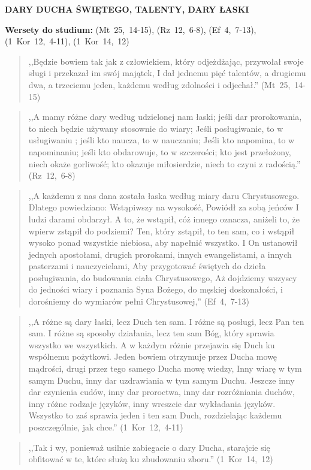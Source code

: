 \documentclass[10pt,a4paper,oneside]{article}
\begin{document}
\centerline{\textbf{\MakeUppercase{Dary Ducha Świętego, talenty, dary łaski}}}
\begin{center}
\textbf{Wersety do studium:} \mbox{(Mt 25, 14-15)}, \mbox{(Rz 12, 6-8)}, \mbox{(Ef 4, 7-13)}, \mbox{(1 Kor 12, 4-11)}, \mbox{(1 Kor 14, 12)}
\end{center}
\begin{quote}
,,Będzie bowiem tak jak z człowiekiem, który odjeżdżając, przywołał swoje sługi i przekazał im swój majątek, I dał jednemu pięć talentów, a drugiemu dwa, a trzeciemu jeden, każdemu według zdolności i odjechał.'' \mbox{(Mt 25, 14-15)}
\end{quote}
\begin{quote}
,,A mamy różne dary według udzielonej nam łaski; jeśli dar prorokowania, to niech będzie używany stosownie do wiary; Jeśli posługiwanie, to w usługiwaniu ; jeśli kto naucza, to w nauczaniu; Jeśli kto napomina, to w napominaniu; jeśli kto obdarowuje, to w szczerości; kto jest przełożony, niech okaże gorliwość; kto okazuje miłosierdzie, niech to czyni z radością.'' \mbox{(Rz 12, 6-8)}
\end{quote}
\begin{quote}
,,A każdemu z nas dana została łaska według miary daru Chrystusowego. Dlatego powiedziano: Wstąpiwszy na wysokość, Powiódł za sobą jeńców I ludzi darami obdarzył. A to, że wstąpił, cóż innego oznacza, aniżeli to, że wpierw zstąpił do podziemi? Ten, który zstąpił, to ten sam, co i wstąpił wysoko ponad wszystkie niebiosa, aby napełnić wszystko. I On ustanowił jednych apostołami, drugich prorokami, innych ewangelistami, a innych pasterzami i nauczycielami, Aby przygotować świętych do dzieła posługiwania, do budowania ciała Chrystusowego, Aż dojdziemy wszyscy do jedności wiary i poznania Syna Bożego, do męskiej doskonałości, i dorośniemy do wymiarów pełni Chrystusowej,'' \mbox{(Ef 4, 7-13)}
\end{quote}
\begin{quote}
,,A różne są dary łaski, lecz Duch ten sam. I różne są posługi, lecz Pan ten sam. I różne są sposoby działania, lecz ten sam Bóg, który sprawia wszystko we wszystkich. A w każdym różnie przejawia się Duch ku wspólnemu pożytkowi. Jeden bowiem otrzymuje przez Ducha mowę mądrości, drugi przez tego samego Ducha mowę wiedzy, Inny wiarę w tym samym Duchu, inny dar uzdrawiania w tym samym Duchu. Jeszcze inny dar czynienia cudów, inny dar proroctwa, inny dar rozróżniania duchów, inny różne rodzaje języków, inny wreszcie dar wykładania języków. Wszystko to zaś sprawia jeden i ten sam Duch, rozdzielając każdemu poszczególnie, jak chce.'' \mbox{(1 Kor 12, 4-11)}
\end{quote}
\begin{quote}
,,Tak i wy, ponieważ usilnie zabiegacie o dary Ducha, starajcie się obfitować w te, które służą ku zbudowaniu zboru.'' \mbox{(1 Kor 14, 12)}
\end{quote}
\end{document}
